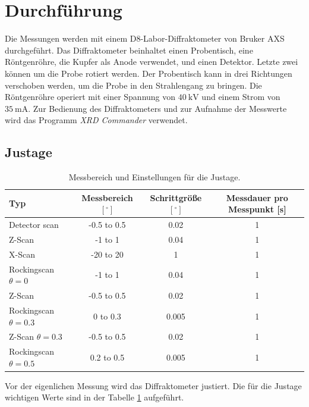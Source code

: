 \section{Durchführung}
\label{sec:Durchführung}
Die Messungen werden mit einem D8-Labor-Diffraktometer von Bruker AXS durchgeführt. 
Das Diffraktometer beinhaltet einen Probentisch, eine Röntgenröhre, die Kupfer als Anode verwendet, und einen Detektor.
Letzte zwei können um die Probe rotiert werden. 
Der Probentisch kann in drei Richtungen verschoben werden, um die Probe in den Strahlengang zu bringen.
Die Röntgenröhre operiert mit einer Spannung von $\SI{40}{\kilo\volt}$ und einem Strom von $\SI{35}{\milli\ampere}$.
Zur Bedienung des Diffraktometers und zur Aufnahme der Messwerte wird das Programm \textit{XRD Commander} verwendet.

\subsection{Justage}
\label{subsec:Justage}
\begin{table}[h!]
    \centering
    \begin{tabular}{lccc}
        \toprule
        \textbf{Typ} & \textbf{Messbereich $[^\circ]$} & \textbf{Schrittgröße $[^\circ]$} & \textbf{Messdauer pro Messpunkt [s]} \\
        \midrule
        Detector scan & -0.5 to 0.5 & 0.02 & 1 \\
        Z-Scan & -1 to 1 & 0.04 & 1 \\
        X-Scan & -20 to 20 & 1 & 1 \\
        Rockingscan $\theta = 0$ & -1 to 1 & 0.04 & 1 \\
        Z-Scan & -0.5 to 0.5 & 0.02 & 1 \\
        Rockingscan $\theta = 0.3$ & 0 to 0.3 & 0.005 & 1 \\
        Z-Scan $\theta = 0.3$ & -0.5 to 0.5 & 0.02 & 1 \\
        Rockingscan $\theta = 0.5$ & 0.2 to 0.5 & 0.005 & 1 \\
        \bottomrule
    \end{tabular}
    \caption{Messbereich und Einstellungen für die Justage.}
    \label{tab:Justage1}
\end{table}
Vor der eigenlichen Messung wird das Diffraktometer justiert.
Die für die Justage wichtigen Werte sind in der Tabelle \ref{tab:Justage1} aufgeführt.

